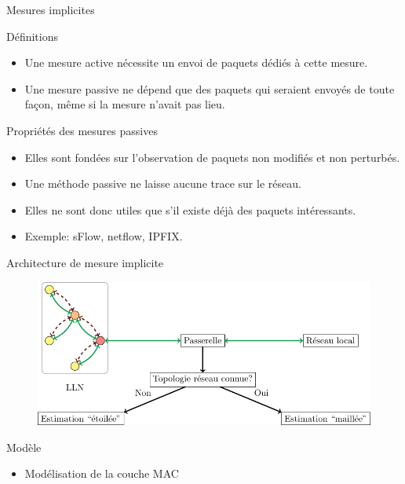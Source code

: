 \begin{frame}{Mesures implicites}
  \begin{block}{Définitions}
    \begin{itemize}
      \item Une mesure active nécessite un envoi de paquets dédiés à cette mesure.
      \item Une mesure passive ne dépend que des paquets qui seraient envoyés de toute façon, même si la mesure n'avait pas lieu.
    \end{itemize}
  \end{block}
  \begin{block}{Propriétés des mesures passives}
    \begin{itemize}
      \item Elles sont fondées sur l'observation de paquets non modifiés et non perturbés.
      \item Une méthode passive ne laisse aucune trace sur le réseau.
      \item Elles ne sont donc utiles que s'il existe déjà des paquets intéressants.
      \item Exemple: sFlow, netflow, IPFIX.
    \end{itemize}
    
  \end{block}

\end{frame}

\begin{frame}{Architecture de mesure implicite}
  \begin{figure}
    \centering
    \includegraphics[width=\textwidth]{figures/schema_supervision_slides.pdf}
  \end{figure}
  \begin{block}{Modèle}
    \begin{itemize}
      \item Modélisation de la couche MAC
    \end{itemize}
  \end{block}
\end{frame}

